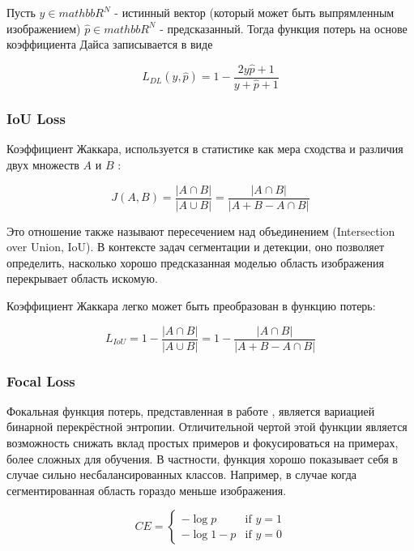 Пусть $y \in mathbb{R}^{N}$ - истинный вектор (который может быть выпрямленным изображением) $\hat{p} \in mathbb{R}^{N}$ - предсказанный.
Тогда функция потерь на основе коэффициента Дайса записывается в виде

\begin{equation}
    L_{DL}(y, \hat{p} ) = 1 - \frac{2y\hat{p} + 1}{y + \hat{p} + 1}
\end{equation}


\subsubsection{IoU Loss}

Коэффициент Жаккара, используется в статистике как мера сходства и различия двух множеств $A$ и $B$ \cite{IoU-Loss}:

\begin{equation}
    J(A,B) = \frac{|A \cap B|}{|A \cup B|} = \frac{|A \cap B|}{|A + B - A \cap B|}
\end{equation}

Это отношение также называют пересечением над объединением 
(Intersection over Union, IoU). В контексте задач сегментации и детекции, 
оно позволяет определить, насколько  хорошо предсказанная моделью область изображения перекрывает
область искомую.

Коэффициент Жаккара легко может быть преобразован в функцию потерь\cite{IoU-Loss-2}:

\begin{equation}
    L_{IoU} = 1- \frac{|A \cap B|}{|A \cup B|} = 1 - \frac{|A \cap B|}{|A + B - A \cap B|}
\end{equation}

\subsubsection{Focal Loss}



Фокальная функция потерь, представленная в работе \cite{Focal-Loss}, является вариацией бинарной перекрёстной энтропии.
Отличительной чертой этой функции является возможность снижать вклад простых примеров и фокусироваться на примерах, более сложных
для обучения. В частности, функция хорошо показывает себя в случае сильно несбалансированных классов.
Например, в случае когда сегментированная область гораздо меньше изображения.


\begin{equation}
    CE=\begin{cases}
        -\log{p} & \text{if }y=1\\
        -\log{1-p} & \text{if }y=0
     \end{cases}
\end{equation}

